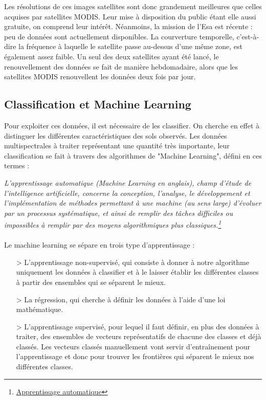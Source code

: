 Les résolutions de ces images satellites sont donc grandement meilleures que celles acquises par satellites MODIS. Leur mise à disposition du public étant elle aussi gratuite, on comprend leur intérêt. 
Néanmoins, la mission de l'Esa est récente : peu de données sont actuellement disponibles. La courverture temporelle, c'est-à-dire la fréquence à laquelle le satellite passe au-dessus d'une même zone, est également assez faible. Un seul des deux satellites ayant été lancé, le renouvellement des données se fait de manière hebdomadaire, alors que les satellites MODIS renouvellent les données deux fois par jour. 

\subsection{Classification et Machine Learning}

Pour exploiter ces données, il est nécessaire de les classifier. On cherche en effet à distinguer les différentes caractéristiques des sols observés. Les données multispectrales à traiter représentant une quantité très importante, leur classification se fait à travers des algorithmes de "Machine Learning", défini en ces termes : 

\textit{L'apprentissage automatique (Machine Learning en anglais), champ d'étude de l'intelligence artificielle, concerne la conception, l'analyse, le développement et l'implémentation de méthodes permettant à une machine (au sens large) d'évoluer par un processus systématique, et ainsi de remplir des tâches difficiles ou impossibles à remplir par des moyens algorithmiques plus classiques.\footnote{\href{https://fr.wikipedia.org/wiki/Apprentissage_automatique}{Apprentissage automatique}}}

\paragraph{}
Le machine learning se sépare en trois type d'apprentissage :
\begin{itemize}
  \item[>] L'apprentissage non-supervisé, qui consiste à donner à notre algorithme uniquement les données à classifier et à le laisser établir les différentes classes à partir des ensembles qui se séparent le mieux.
  \item[>] La régression, qui cherche à définir les données à l'aide d'une loi mathématique.
  \item[>] L'apprentissage supervisé, pour lequel il faut définir, en plus des données à traiter, des ensembles de vecteurs représentatifs de chacune des classes et déjà classés. Les vecteurs classés manuellement vont servir d’entraînement pour l'apprentissage et donc pour trouver les frontières qui séparent le mieux nos différentes classes.
\end{itemize}


